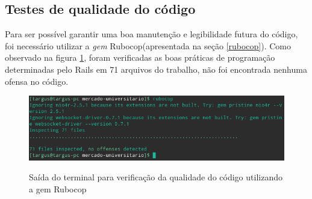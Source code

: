 \subsection{Testes de qualidade do código}
Para ser possível garantir uma boa manutenção e legibilidade futura do código, foi necessário utilizar a \textit{gem} Rubocop(apresentada na seção \ref{rubocop}). Como observado na figura \ref{fig:rubocop}, foram verificadas as boas práticas de programação determinadas pelo Rails em 71 arquivos do trabalho, não foi encontrada nenhuma ofensa no código.
\begin{figure}[htbp!]
  \centering
  \caption{Saída do terminal para verificação da qualidade do código utilizando a gem Rubocop}
  \includegraphics[width=1\textwidth]{figs/rubocop.png}
    \label{fig:rubocop}
\end{figure}
